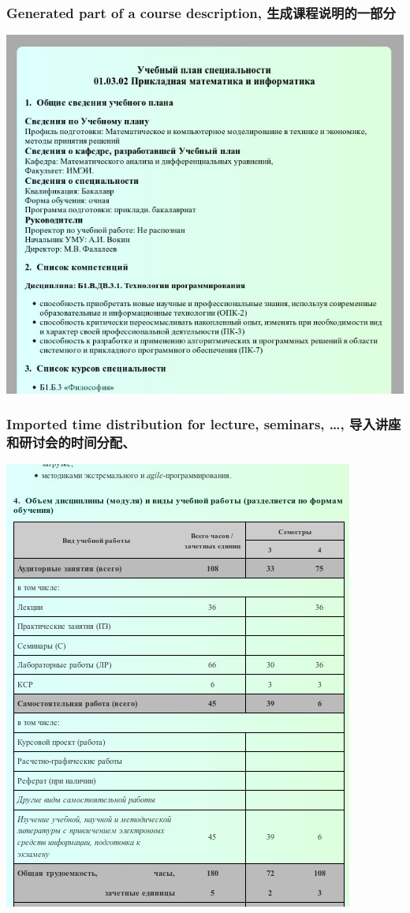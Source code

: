 \documentclass[10pt]{beamer}
\begin{document}
\begin{frame}
  \frametitle{Generated part of a course description, 生成课程说明的一部分}
   \begin{adjustwidth}{-2.5em}{-2.5em}
    \begin{center}
      \includegraphics[width=0.7\linewidth]{template-courses.jpg}
    \end{center}
  \end{adjustwidth}
\end{frame}
\begin{frame}
  \frametitle{Imported time distribution for lecture, seminars, \ldots{}, 导入讲座和研讨会的时间分配、 }
   \begin{adjustwidth}{-2.5em}{-2.5em}
    \begin{center}
      \includegraphics[width=0.9\linewidth]{work-program-volume.jpg}
    \end{center}
  \end{adjustwidth}
\end{frame}
\end{document}
